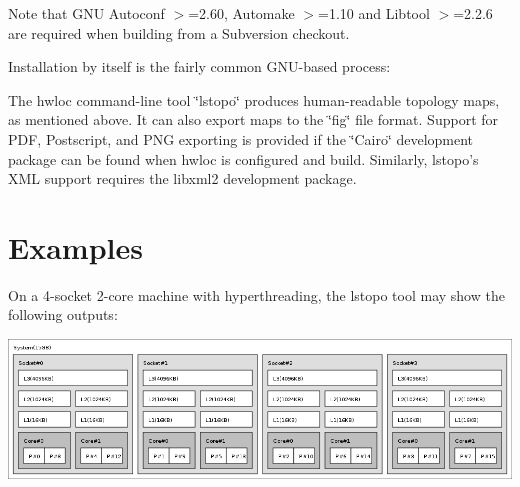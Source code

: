 Note that GNU Autoconf $>$=2.60, Automake $>$=1.10 and Libtool $>$=2.2.6 are required when building from a Subversion checkout.

Installation by itself is the fairly common GNU-\/based process:




The hwloc command-\/line tool \char`\"{}lstopo\char`\"{} produces human-\/readable topology maps, as mentioned above. It can also export maps to the \char`\"{}fig\char`\"{} file format. Support for PDF, Postscript, and PNG exporting is provided if the \char`\"{}Cairo\char`\"{} development package can be found when hwloc is configured and build. Similarly, lstopo's XML support requires the libxml2 development package.

 \hypertarget{index_examples}{}\section{Examples}\label{index_examples}
On a 4-\/socket 2-\/core machine with hyperthreading, the {\ttfamily lstopo} tool may show the following outputs:

 
\begin{DoxyImageNoCaption}
  \mbox{\includegraphics[width=\textwidth]{dudley.png}}
\end{DoxyImageNoCaption}





